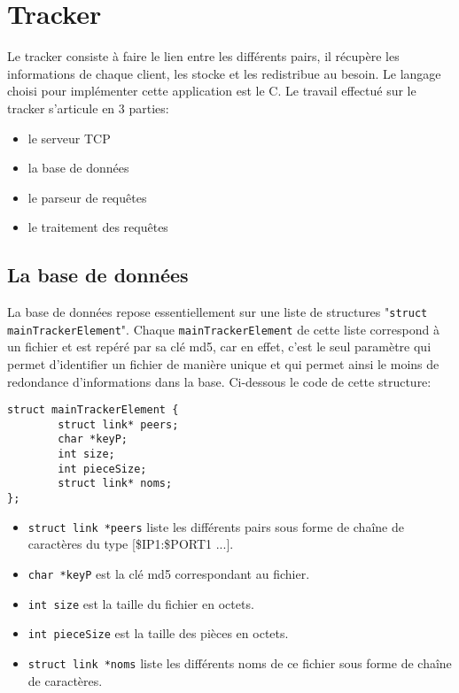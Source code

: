 \section{Tracker}
Le tracker consiste à faire le lien entre les différents pairs, il récupère les informations de chaque client, les stocke et les redistribue au besoin. Le langage choisi pour implémenter cette application est le C. Le travail effectué sur le tracker s'articule en 3 parties:

\begin{itemize}
\item le serveur TCP
\item la base de données
\item le parseur de requêtes
\item le traitement des requêtes
\end{itemize}

\subsection{La base de données}
La base de données repose essentiellement sur une liste de structures "\texttt{struct mainTrackerElement}". Chaque \texttt{mainTrackerElement} de cette liste correspond à un fichier et est repéré par sa clé md5, car en effet, c'est le seul paramètre qui permet d'identifier un fichier de manière unique et qui permet ainsi le moins de redondance d'informations dans la base. Ci-dessous le code de cette structure:

\begin{verbatim}
struct mainTrackerElement {
        struct link* peers;
        char *keyP;
        int size;
        int pieceSize;
        struct link* noms;
};
\end{verbatim}

\begin{itemize}
\item \texttt{struct link *peers} liste les différents pairs sous forme de chaîne de caractères du type [\$IP1:\$PORT1 ...].
\item \texttt{char *keyP} est la clé md5 correspondant au fichier.
\item \texttt{int size} est la taille du fichier en octets.
\item \texttt{int pieceSize} est la taille des pièces en octets.
\item \texttt{struct link *noms} liste les différents noms de ce fichier sous forme de chaîne de caractères.
\end{itemize}

